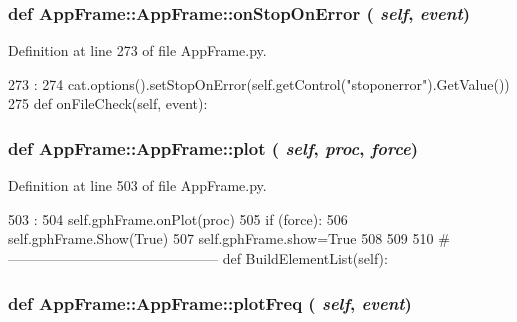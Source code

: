 \hypertarget{classAppFrame_1_1AppFrame_a5d4fbe570c7b419c71b5a28e920ef0b3}{
\subsubsection[{onStopOnError}]{\setlength{\rightskip}{0pt plus 5cm}def AppFrame::AppFrame::onStopOnError ( {\em self}, \/   {\em event})}}
\label{classAppFrame_1_1AppFrame_a5d4fbe570c7b419c71b5a28e920ef0b3}


Definition at line 273 of file AppFrame.py.


\begin{DoxyCode}
273                                   :
274         cat.options().setStopOnError(self.getControl("stoponerror").GetValue())
275 
    def onFileCheck(self, event):
\end{DoxyCode}
\hypertarget{classAppFrame_1_1AppFrame_a16fc60c79fde4dd7d9591ed3f21c3c01}{
\subsubsection[{plot}]{\setlength{\rightskip}{0pt plus 5cm}def AppFrame::AppFrame::plot ( {\em self}, \/   {\em proc}, \/   {\em force})}}
\label{classAppFrame_1_1AppFrame_a16fc60c79fde4dd7d9591ed3f21c3c01}


Definition at line 503 of file AppFrame.py.


\begin{DoxyCode}
503                                :
504         self.gphFrame.onPlot(proc)
505         if (force):
506             self.gphFrame.Show(True)
507             self.gphFrame.show=True            
508 
509         
510     #---------------------------------------------
    def BuildElementList(self):
\end{DoxyCode}
\hypertarget{classAppFrame_1_1AppFrame_a724d4fb4f7b45e38c3002dafaf31ae3d}{
\subsubsection[{plotFreq}]{\setlength{\rightskip}{0pt plus 5cm}def AppFrame::AppFrame::plotFreq ( {\em self}, \/   {\em event})}}
\label{classAppFrame_1_1AppFrame_a724d4fb4f7b45e38c3002dafaf31ae3d}


